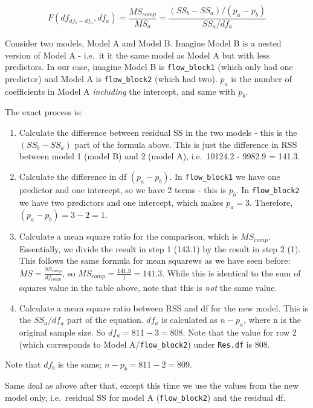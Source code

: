 \documentclass[
]{book}
\begin{document}
\[
F(df_{df_b - df_a}, df_a) = \frac{MS_{comp}}{MS_{a}} = \frac{(SS_b - SS_a)/(p_a - p_b)}{SS_a/df_a}
\]

Consider two models, Model A and Model B. Imagine Model B is a nested version of Model A - i.e.~it it the same model as Model A but with less predictors. In our case, imagine Model B is \texttt{flow\_block1} (which only had one predictor) and Model A is \texttt{flow\_block2} (which had two). \(p_a\) is the number of coefficients in Model A \emph{including} the intercept, and same with \(p_b\).

The exact process is:

\begin{enumerate}
\def\labelenumi{\arabic{enumi}.}
\item
  Calculate the difference between residual SS in the two models - this is the \((SS_b - SS_a)\) part of the formula above. This is just the difference in RSS between model 1 (model B) and 2 (model A), i.e.~10124.2 - 9982.9 = 141.3.
\item
  Calculate the difference in df \((p_a - p_b)\). In \texttt{flow\_block1} we have one predictor and one intercept, so we have 2 terms - this is \(p_b\). In \texttt{flow\_block2} we have two predictors and one intercept, which makes \(p_a = 3\). Therefore, \((p_a - p_b) = 3 - 2 = 1\).
\item
  Calculate a mean square ratio for the comparison, which is \(MS_{comp}\). Essentially, we divide the result in step 1 (143.1) by the result in step 2 (1). This follows the same formula for mean squarews as we have seen before: \(MS = \frac{SS_{comp}}{df_{comp}}\), so
  \(MS_{comp} = \frac{141.3}{1} = 141.3.\) While this is identical to the sum of squares value in the table above, note that this is \emph{not} the same value.
\item
  Calculate a mean square ratio between RSS and df for the new model. This is the \(SS_a/df_a\) part of the equation. \(df_a\) is calculated as \(n - p_a\), where n is the original sample size. So \(df_a = 811 - 3 = 808\). Note that the value for row 2 (which corresponds to Model A/\texttt{flow\_block2}) under \texttt{Res.df} is 808.
\end{enumerate}

Note that \(df_b\) is the same; \(n - p_b = 811 - 2 = 809\).

Same deal as above after that, except this time we use the values from the new model only, i.e.~residual SS for model A (\texttt{flow\_block2}) and the residual df.
\end{document}
